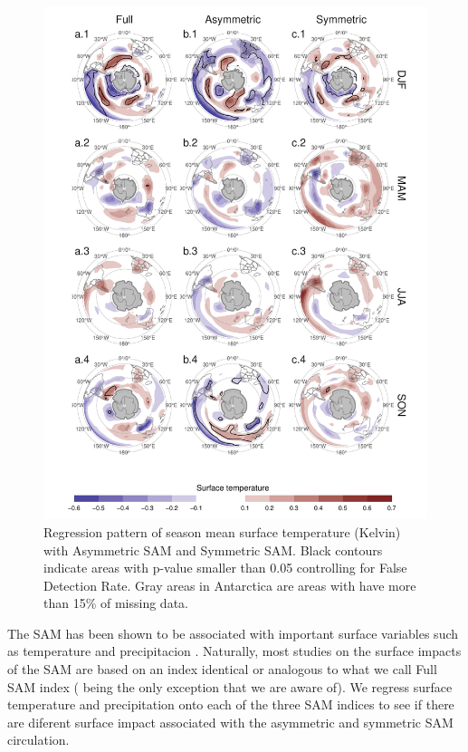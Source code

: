 \documentclass[]{ametsocV5}
\begin{document}
\begin{figure}
\includegraphics{regr-air-season-1} \caption[Regression pattern of season mean surface temperature (Kelvin) with Asymmetric SAM and Symmetric SAM]{Regression pattern of season mean surface temperature (Kelvin) with Asymmetric SAM and Symmetric SAM. Black contours indicate areas with p-value smaller than 0.05 controlling for False Detection Rate. Gray areas in Antarctica are areas with have more than 15\% of missing data.}\label{fig:regr-air-season}
\end{figure}

The SAM has been shown to be associated with important surface variables
such as temperature and precipitacion \citep[e.g.][and see
\citet{fogt2020} for a review]{gillett2006}. Naturally, most studies on
the surface impacts of the SAM are based on an index identical or
analogous to what we call Full SAM index (\citet{fogt2012} being the
only exception that we are aware of). We regress surface temperature and
precipitation onto each of the three SAM indices to see if there are
diferent surface impact associated with the asymmetric and symmetric SAM
circulation.
\end{document}
